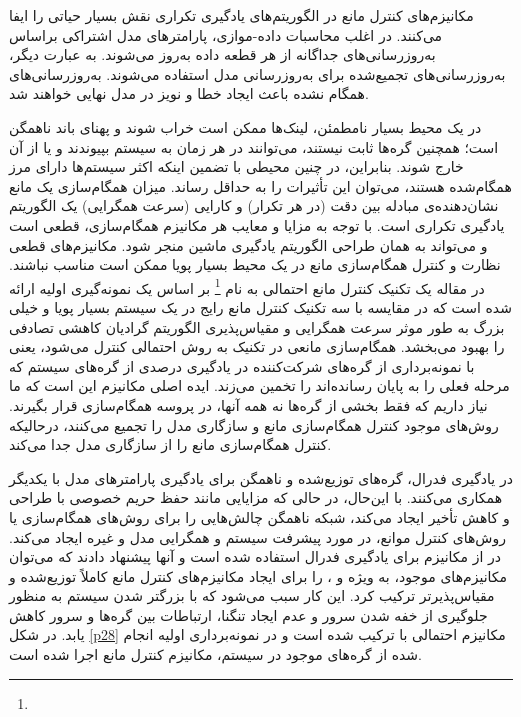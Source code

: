 مکانیزم‌های کنترل مانع در الگوریتم‌های یادگیری تکراری نقش بسیار حیاتی را ایفا می‌کنند. در اغلب محاسبات داده-موازی، پارامترهای مدل اشتراکی براساس به‌روزرسانی‌های جداگانه از هر قطعه داده به‌روز می‌شوند. به عبارت دیگر، به‌روزرسانی‌های تجمیع‌شده برای به‌روزرسانی مدل استفاده می‌شوند. به‌روزرسانی‌های همگام نشده باعث ایجاد خطا و نویز در مدل نهایی خواهند شد. 

در یک محیط بسیار نامطمئن، لینک‌ها ممکن است خراب شوند و پهنای باند ناهمگن است؛ همچنین گره‌ها ثابت نیستند، می‌توانند در هر زمان به سیستم بپیوندند و یا از آن خارج شوند. بنابراین، در چنین محیطی با تضمین اینکه اکثر سیستم‌ها دارای مرز همگام‌شده هستند، می‌توان این تأثیرات را به حداقل رساند. میزان همگام‌سازی یک مانع نشان‌دهنده‌ی مبادله بین دقت (در هر تکرار) و کارایی (سرعت همگرایی) یک الگوریتم یادگیری تکراری است. با توجه به مزایا و معایب هر مکانیزم همگام‌سازی،  قطعی است و می‌تواند به همان طراحی الگوریتم یادگیری ماشین منجر شود. مکانیزم‌های قطعی نظارت و کنترل همگام‌سازی مانع در یک محیط بسیار پویا ممکن است مناسب نباشند. در مقاله \cite{wang2017} یک تکنیک کنترل مانع احتمالی به نام \footnote{} بر اساس یک نمونه‌گیری اولیه ارائه شده است که در مقایسه با سه تکنیک کنترل مانع رایج در یک سیستم بسیار پویا و خیلی بزرگ به طور موثر سرعت همگرایی و مقیاس‌پذیری الگوریتم گرادیان کاهشی تصادفی را بهبود می‌بخشد. همگام‌سازی مانعی در تکنیک  به روش احتمالی کنترل می‌شود، یعنی با نمونه‌برداری از گره‌های شرکت‌کننده در یادگیری درصدی از گره‌های سیستم که مرحله فعلی را به پایان رسانده‌اند را تخمین می‌زند. ایده اصلی مکانیزم  این است که ما نیاز داریم که فقط بخشی از گره‌ها نه همه آنها، در پروسه همگام‌سازی قرار بگیرند. روش‌های موجود کنترل همگام‌سازی مانع و سازگاری مدل را تجمیع می‌کنند، درحالیکه  کنترل همگام‌سازی مانع را از سازگاری مدل جدا می‌کند. 

در یادگیری فدرال، گره‌های توزیع‌شده و ناهمگن برای یادگیری پارامترهای مدل با یکدیگر همکاری می‌کنند. با این‌حال، در حالی که مزایایی مانند حفظ حریم خصوصی با طراحی و کاهش تأخیر ایجاد می‌کند، شبکه ناهمگن چالش‌هایی را برای روش‌های همگام‌سازی یا روش‌های کنترل موانع، در مورد پیشرفت سیستم و همگرایی مدل و غیره ایجاد می‌کند. در \cite{Zhao2021} از مکانیزم  برای یادگیری فدرال استفاده شده است و آنها پیشنهاد دادند که می‌توان مکانیزم‌های موجود، به ویژه  و ، را برای ایجاد مکانیزم‌های کنترل مانع کاملاً توزیع‌شده و مقیاس‌پذیرتر ترکیب کرد. این کار سبب می‌شود که با بزرگتر شدن سیستم به منظور جلوگیری از خفه شدن سرور و عدم ایجاد تنگنا، ارتباطات بین گره‌ها و سرور کاهش یابد. در شکل \ref{p28} مکانیزم احتمالی  با  ترکیب شده است و در نمونه‌برداری اولیه انجام شده از گره‌های موجود در سیستم، مکانیزم کنترل مانع  اجرا شده است.


